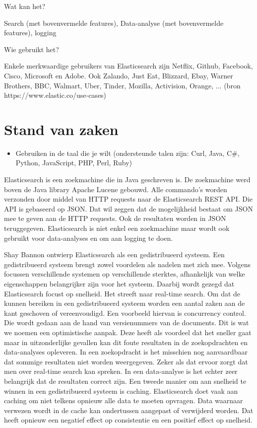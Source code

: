 {Wat kan het? 

Search (met bovenvermelde features), Data-analyse (met bovenvermelde features), logging 

Wie gebruikt het? 

Enkele merkwaardige gebruikers van Elasticsearch zijn Netflix, Github, Facebook, Cisco, Microsoft en Adobe. Ook Zalando, Just Eat, Blizzard, Ebay, Warner Brothers, BBC, Walmart, Uber, Tinder, Mozilla, Activision, Orange, ... (bron https://www.elastic.co/use-cases)

\section{Stand van zaken}
\label{sec:stand-van-zaken}


\begin{itemize}
	\item Gebruiken in de taal die je wilt (ondersteunde talen zijn: Curl, Java, C\#, Python, JavaScript, PHP, Perl, Ruby)
	
\end{itemize}

Elasticsearch is een zoekmachine die in Java geschreven is. De zoekmachine werd boven de Java library Apache Lucene gebouwd. Alle commando's worden verzonden door middel van HTTP requests naar de Elasticsearch REST API. Die API is gebaseerd op JSON. Dat wil zeggen dat de mogelijkheid bestaat om JSON mee te geven aan de HTTP requests. Ook de resultaten worden in JSON teruggegeven. Elasticsearch is niet enkel een zoekmachine maar wordt ook gebruikt voor data-analyses en om aan logging te doen. 

Shay Bannon ontwierp Elasticsearch als een gedistribueerd systeem. Een gedistribueerd systeem brengt zowel voordelen als nadelen met zich mee. Volgens \textcite{Brasetvik2013s} focussen verschillende systemen op verschillende sterktes, afhankelijk van welke eigenschappen belangrijker zijn voor het systeem. Daarbij wordt gezegd dat Elasticsearch focust op snelheid. Het streeft naar real-time search. Om dat de kunnen bereiken in een gedistribueerd systeem worden een aantal zaken aan de kant geschoven of vereenvoudigd. Een voorbeeld hiervan is concurrency control. Die wordt gedaan aan de hand van versienummers van de documents. Dit is wat we noemen een optimistische aanpak. Deze heeft als voordeel dat het sneller gaat maar in uitzonderlijke gevallen kan dit foute resultaten in de zoekopdrachten en data-analyses opleveren. In een zoekopdracht is het misschien nog aanvaardbaar dat sommige resultaten niet worden weergegeven. Zeker als dat ervoor zorgt dat men over real-time search kan spreken. In een data-analyse is het echter zeer belangrijk dat de resultaten correct zijn. Een tweede manier om aan snelheid te winnen in een gedistribueerd systeem is caching. Elasticsearch doet vaak aan caching om niet telkens opnieuw alle data te moeten opvragen. Data waarnaar verwezen wordt in de cache kan ondertussen aangepast of verwijderd worden. Dat heeft opnieuw een negatief effect op consistentie en een positief effect op snelheid.

}
